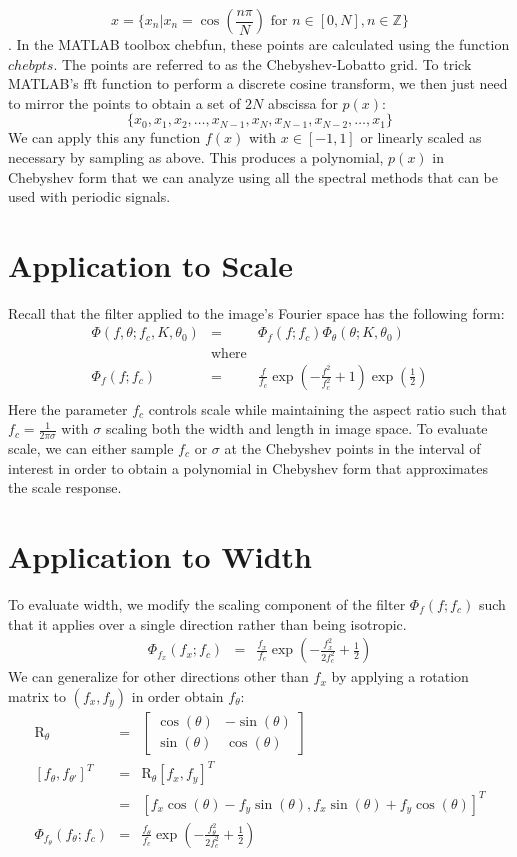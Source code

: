 \documentclass{article}
\begin{document}
\[ x = \{ x_n | x_n = \cos(\frac{n\pi}{N}) \mbox{ for } n \in [0,N], n \in \mathbb{Z} \} \].
In the MATLAB toolbox chebfun, these points are calculated using the function $ chebpts $. The points are referred to as the Chebyshev-Lobatto grid. To trick MATLAB's fft function to perform a discrete cosine transform, we then just need to mirror the points to obtain a set of $ 2N $ abscissa for $ p(x) $:
\[ \{x_0, x_1, x_2, \hdots, x_{N-1}, x_N, x_{N-1}, x_{N-2}, \hdots, x_1\} \]
We can apply this any function $ f(x) $ with $ x \in [-1,1] $ or linearly scaled as necessary by sampling as above. This produces a polynomial, $ p(x) $ in Chebyshev form that we can analyze using all the spectral methods that can be used with periodic signals.
\section{Application to Scale}
Recall that the filter applied to the image's Fourier space has the following form:
\begin{eqnarray}
    \Phi(f,\theta; f_c, K, \theta_0) & = & \Phi_f(f; f_c) \Phi_\theta(\theta; K, \theta_0) \\
    & \mbox{where} & \nonumber \\
    \Phi_f(f; f_c) & = & \frac{f}{f_c} \exp(-\frac{f^2}{f_c^2}+1) \exp(\frac{1}{2}) \\
\end{eqnarray}
Here the parameter $ f_c $ controls scale while maintaining the aspect ratio such that $ f_c = \frac{1}{2\pi \sigma} $ with $ \sigma $ scaling both the width and length in image space. To evaluate scale, we can either sample $ f_c $ or $ \sigma $ at the Chebyshev points in the interval of interest in order to obtain a polynomial in Chebyshev form that approximates the scale response.
\section{Application to Width}
To evaluate width, we modify the scaling component of the filter $ \Phi_f(f; f_c) $ such that it applies over a single direction rather than being isotropic.
\begin{eqnarray}
    \Phi_{f_x}(f_x; f_c) & = & \frac{f_x}{f_c} \exp(-\frac{f_x^2}{2f_c^2}+\frac{1}{2})
\end{eqnarray}
We can generalize for other directions other than $ f_x $ by applying a rotation matrix to $ (f_x,f_y) $ in order obtain $ f_\theta $:
\begin{eqnarray}
    \mathrm{R}_\theta & = &
    \begin{bmatrix}
        \cos(\theta) & -\sin(\theta) \\
        \sin(\theta) & \cos(\theta)
    \end{bmatrix} \\
   \left[f_{\theta},f_{\theta'}\right]^T  & = & \mathrm{R}_\theta [f_x,f_y]^T \\
    & = & [ f_x\cos(\theta)  -f_y \sin(\theta) , f_x \sin(\theta) + f_y \cos(\theta) ]^T  \\
    \Phi_{f_\theta}(f_\theta; f_c) & = & \frac{f_\theta}{f_c} \exp(-\frac{f_\theta^2}{2f_c^2}+\frac{1}{2}) 
\end{eqnarray}
\end{document}
